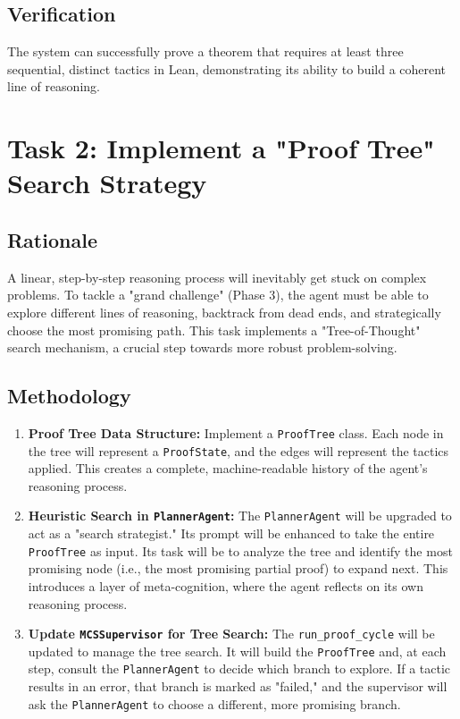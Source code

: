 \documentclass{article}
\begin{document}
\subsection{Verification}
The system can successfully prove a theorem that requires at least three sequential, distinct tactics in Lean, demonstrating its ability to build a coherent line of reasoning.

\section{Task 2: Implement a "Proof Tree" Search Strategy}

\subsection{Rationale}
A linear, step-by-step reasoning process will inevitably get stuck on complex problems. To tackle a "grand challenge" (Phase 3), the agent must be able to explore different lines of reasoning, backtrack from dead ends, and strategically choose the most promising path. This task implements a "Tree-of-Thought" search mechanism, a crucial step towards more robust problem-solving.

\subsection{Methodology}
\begin{enumerate}
    \item \textbf{Proof Tree Data Structure:} Implement a \texttt{ProofTree} class. Each node in the tree will represent a \texttt{ProofState}, and the edges will represent the tactics applied. This creates a complete, machine-readable history of the agent's reasoning process.
    \item \textbf{Heuristic Search in \texttt{PlannerAgent}:} The \texttt{PlannerAgent} will be upgraded to act as a "search strategist." Its prompt will be enhanced to take the entire \texttt{ProofTree} as input. Its task will be to analyze the tree and identify the most promising node (i.e., the most promising partial proof) to expand next. This introduces a layer of meta-cognition, where the agent reflects on its own reasoning process.
    \item \textbf{Update \texttt{MCSSupervisor} for Tree Search:} The \texttt{run\_proof\_cycle} will be updated to manage the tree search. It will build the \texttt{ProofTree} and, at each step, consult the \texttt{PlannerAgent} to decide which branch to explore. If a tactic results in an error, that branch is marked as "failed," and the supervisor will ask the \texttt{PlannerAgent} to choose a different, more promising branch.
\end{enumerate}
\end{document}
